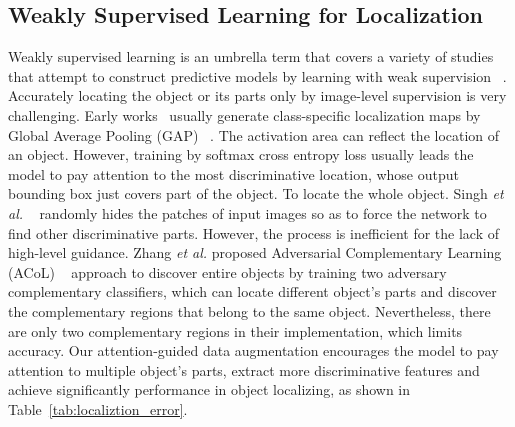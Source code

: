 \documentclass[10pt,twocolumn,letterpaper]{article}
\def\etal{{\em et al. }}
\begin{document}
\subsection{Weakly Supervised Learning for Localization}
Weakly supervised learning is an umbrella term that covers a variety of studies that attempt to construct predictive models by learning with weak supervision ~\cite{review:wsl}. Accurately locating the object or its parts only by image-level supervision is very challenging. Early works~\cite{box_predict,Zhang2016TopDownNA} usually generate class-specific localization maps by Global Average Pooling (GAP) ~\cite{nin}. The activation area can reflect the location of an object. However, training by softmax cross entropy loss usually leads the model to pay attention to the most discriminative location, whose output bounding box just covers part of the object. To locate the whole object. Singh \etal ~\cite{hide-and-seek} randomly hides the patches of input images so as to force the network to find other discriminative parts. However, the process is inefficient for the lack of high-level guidance. Zhang \etal proposed Adversarial Complementary Learning (ACoL) ~\cite{acol} approach to discover entire objects by training two adversary complementary classifiers, which can locate different object's parts and discover the complementary regions that belong to the same object. Nevertheless, there are only two complementary regions in their implementation, which limits accuracy.  Our attention-guided data augmentation encourages the model to pay attention to multiple object's parts, extract more discriminative features and achieve significantly performance in object localizing, as shown in Table~\ref{tab:localiztion_error}.
\end{document}
